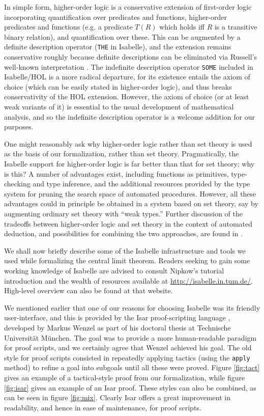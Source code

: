 \documentclass{article}
\theoremstyle{definition}
\begin{document}
In simple form, higher-order logic is a conservative extension of first-order logic incorporating quantification over predicates and functions, higher-order predicates and functions (e.g. a predicate $T(R)$ which holds iff $R$ is a transitive binary relation), and quantification over these. This can be augmented by a definite description operator (\texttt{THE} in Isabelle), and the extension remains conservative roughly because definite descriptions can be eliminated via Russell's well-known interpretation \cite{russell-knowledge-acquaintance-description}. The indefinite description operator \texttt{SOME} included in Isabelle/HOL is a more radical departure, for its existence entails the axiom of choice (which can be easily stated in higher-order logic), and thus breaks conservativity of the HOL extension. However, the axiom of choice (or at least weak variants of it) is essential to the usual development of mathematical analysis, and so the indefinite description operator is a welcome addition for our purposes.

One might reasonably ask why higher-order logic rather than set theory is used as the basis of our formalization, rather than set theory. Pragmatically, the Isabelle support for higher-order logic is far better than that for set theory; why is this? A number of advantages exist, including functions as primitives, type-checking and type inference, and the additional resources provided by the type system for pruning the search space of automated procedures. However, all these advantages could in principle be obtained in a system based on set theory, say by augmenting ordinary set theory with ``weak types.'' Further discussion of the tradeoffs between higher-order logic and set theory in the context of automated deduction, and possibilities for combining the two approaches, are found in \cite{gordon-hol-set}.

We shall now briefly describe some of the Isabelle infrastructure and tools we used while formalizing the central limit theorem. Readers seeking to gain some working knowledge of Isabelle are advised to consult Nipkow's tutorial introduction \cite{nipkow-prog-prove} and the wealth of resources available at \url{http://isabelle.in.tum.de/}. High-level overview can also be found at that website.

We mentioned earlier that one of our reasons for choosing Isabelle was its friendly user-interface, and this is provided by the Isar proof-scripting language \cite{wenzel-isar}, developed by Markus Wenzel as part of his doctoral thesis at Technische Universit\"at M\"unchen. The goal was to provide a more human-readable paradigm for proof scripts, and we certainly agree that Wenzel achieved his goal. The old style for proof scripts consisted in repeatedly applying tactics (using the \texttt{apply} method) to refine a goal into subgoals until all these were proved. Figure \ref{fig:tact} gives an example of a tactical-style proof from our formalization, while figure \ref{fig:isar} gives an example of an Isar proof. These styles can also be combined, as can be seen in figure \ref{fig:mix}. Clearly Isar offers a great improvement in readability, and hence in ease of maintenance, for proof scripts.
\end{document}
